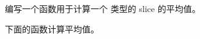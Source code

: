 \begin{Exercise}[title={平均值},difficulty=4]
\label{ex:average}
\Question\label{ex:average q1} 编写一个函数用于计算一个  类型的 slice 的平均值。
\end{Exercise}

\begin{Answer}
\Question 下面的函数计算平均值。

\showremarks
\end{Answer}
